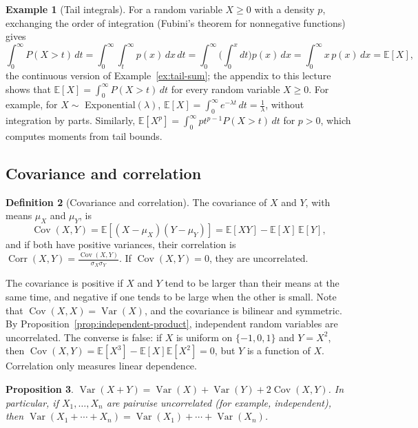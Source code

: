 \documentclass[11pt]{article}
\newcommand{\E}{\mathbb{E}}
\DeclareMathOperator{\Var}{Var}
\DeclareMathOperator{\Cov}{Cov}
\DeclareMathOperator{\Corr}{Corr}
\theoremstyle{definition}
\newtheorem{definition}{Definition}[section]
\newtheorem{example}[definition]{Example}
\theoremstyle{plain}
\newtheorem{proposition}[definition]{Proposition}
\theoremstyle{remark}
\begin{document}
\begin{example}[Tail integrals]\label{ex:tail-integral}
    For a random variable $X \geq 0$ with a density $p$, exchanging the order of integration (Fubini's theorem for nonnegative functions) gives
    \[\int_0^\infty P(X > t)\, dt = \int_0^\infty\!\!\int_t^\infty p(x)\, dx\, dt = \int_0^\infty\Big(\int_0^x dt\Big)p(x)\, dx = \int_0^\infty x\,p(x)\, dx = \E[X],\]
    the continuous version of Example~\ref{ex:tail-sum}; the appendix to this lecture shows that $\E[X] = \int_0^\infty P(X > t)\, dt$ for every random variable $X \geq 0$. For example, for $X \sim$ Exponential$(\lambda)$, $\E[X] = \int_0^\infty e^{-\lambda t}\, dt = \frac{1}{\lambda}$, without integration by parts. Similarly, $\E[X^p] = \int_0^\infty pt^{p-1}P(X > t)\, dt$ for $p > 0$, which computes moments from tail bounds.
\end{example}

\subsection{Covariance and correlation}

\begin{definition}[Covariance and correlation]\label{def:covariance}
    The covariance of $X$ and $Y$, with means $\mu_X$ and $\mu_Y$, is
    \[\Cov(X, Y) = \E[(X - \mu_X)(Y - \mu_Y)] = \E[XY] - \E[X]\,\E[Y],\]
    and if both have positive variances, their correlation is $\Corr(X, Y) = \frac{\Cov(X, Y)}{\sigma_X\sigma_Y}$. If $\Cov(X, Y) = 0$, they are uncorrelated.
\end{definition}

The covariance is positive if $X$ and $Y$ tend to be larger than their means at the same time, and negative if one tends to be large when the other is small. Note that $\Cov(X, X) = \Var(X)$, and the covariance is bilinear and symmetric. By Proposition~\ref{prop:independent-product}, independent random variables are uncorrelated. The converse is false: if $X$ is uniform on $\{-1, 0, 1\}$ and $Y = X^2$, then $\Cov(X, Y) = \E[X^3] - \E[X]\E[X^2] = 0$, but $Y$ is a function of $X$. Correlation only measures linear dependence.

\begin{proposition}\label{prop:variance-sum}
    $\Var(X + Y) = \Var(X) + \Var(Y) + 2\Cov(X, Y)$. In particular, if $X_1, \ldots, X_n$ are pairwise uncorrelated (for example, independent), then $\Var(X_1 + \cdots + X_n) = \Var(X_1) + \cdots + \Var(X_n)$.
\end{proposition}
\end{document}
